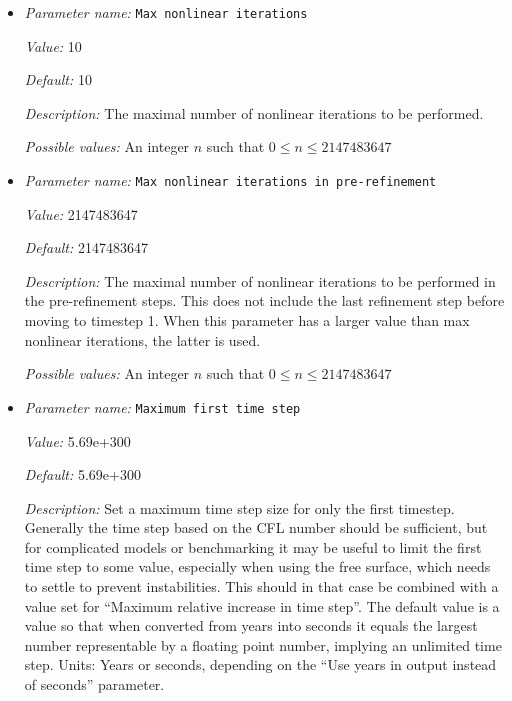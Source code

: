 \begin{itemize}
{\it Possible values:} A floating point number $v$ such that $-\text{MAX\_DOUBLE} \leq v \leq \text{MAX\_DOUBLE}$
\item {\it Parameter name:} {\tt Max nonlinear iterations}
\label{parameters:Max nonlinear iterations}


{\it Value:} 10


{\it Default:} 10


{\it Description:} The maximal number of nonlinear iterations to be performed.


{\it Possible values:} An integer $n$ such that $0\leq n \leq 2147483647$
\item {\it Parameter name:} {\tt Max nonlinear iterations in pre-refinement}
\label{parameters:Max nonlinear iterations in pre-refinement}


{\it Value:} 2147483647


{\it Default:} 2147483647


{\it Description:} The maximal number of nonlinear iterations to be performed in the pre-refinement steps. This does not include the last refinement step before moving to timestep 1. When this parameter has a larger value than max nonlinear iterations, the latter is used.


{\it Possible values:} An integer $n$ such that $0\leq n \leq 2147483647$
\item {\it Parameter name:} {\tt Maximum first time step}
\label{parameters:Maximum first time step}


{\it Value:} 5.69e+300


{\it Default:} 5.69e+300


{\it Description:} Set a maximum time step size for only the first timestep. Generally the time step based on the CFL number should be sufficient, but for complicated models or benchmarking it may be useful to limit the first time step to some value, especially when using the free surface, which needs to settle to prevent instabilities. This should in that case be combined with a value set for ``Maximum relative increase in time step''. The default value is a value so that when converted from years into seconds it equals the largest number representable by a floating point number, implying an unlimited time step. Units: Years or seconds, depending on the ``Use years in output instead of seconds'' parameter.



\end{itemize}
